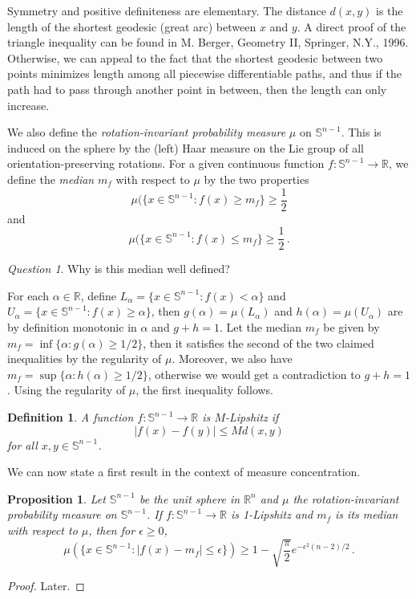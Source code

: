 \documentclass[12pt]{article}
\newtheorem{prop}[thm]{Proposition}
\newtheorem{defn}[thm]{Definition}
\theoremstyle{remark}
\newtheorem{question}[thm]{Question}
\def\eps{\epsilon}
\def\Snm1{\mathbb S^{n-1}}
\def\R{\mathbb R}
\begin{document}
Symmetry and positive definiteness are elementary.
The distance $d(x,y)$ is the length of the shortest geodesic (great arc) between $x$ and $y$. A direct proof of
the triangle inequality can be found in M. Berger, Geometry II, Springer, N.Y., 1996. Otherwise, we can 
appeal to the fact that the shortest geodesic between two points minimizes length among all piecewise differentiable
paths, and thus if the path had to pass through another point in between, then the length can only increase.

We also define the {\em rotation-invariant probability measure} $\mu$ on $\Snm1$. This is induced on the sphere by 
the (left) Haar measure on the Lie group of all orientation-preserving rotations. For a given continuous function
$f: \Snm1 \to \R$, we define the {\em median} $m_f$ with respect to $\mu$ by the two properties
$$
   \mu(\{x \in \Snm1: f(x) \ge m_f\} \ge \frac 1 2
$$ 
and
$$
    \mu(\{x \in \Snm1: f(x) \le m_f\} \ge \frac 1 2 \, .
$$

\begin{question} Why is this median well defined?\end{question}

For each $\alpha\in \mathbb R$, define $L_\alpha = \{x \in \Snm1: f(x) < \alpha\}$ and
$U_\alpha = \{x \in \Snm1: f(x) \ge \alpha\}$,
then $g(\alpha)=\mu(L_\alpha)$ and $h(\alpha)=\mu(U_\alpha)$ are by definition monotonic in $\alpha$ and
$g+h=1$. Let the median $m_f$
be given by $m_f=\inf\{ \alpha: g(\alpha)\ge 1/2\}$, then it satisfies the second of the two claimed inequalities
by the regularity of $\mu$. Moreover, we also have $m_f = \sup\{ \alpha:  h(\alpha) \ge 1/2\}$, otherwise we would
get a contradiction to $g+h=1$. Using the regularity of $\mu$, the first inequality follows.

\begin{defn} A function $ f : \Snm1 \to \R$ is $M$-Lipshitz if
$$
    |f(x) - f(y)| \le M d(x,y)
$$
for all $x, y \in \Snm1$.
\end{defn}

We can now state a first result in the context of  measure concentration.

\begin{prop} \label{prop:consnm1}Let $\Snm1$ be the unit sphere in $\mathbb R^n$ and $\mu$ the
rotation-invariant probability measure on $\Snm1$. If $f: \Snm1 \to \R$ is 1-Lipshitz and $m_f$ is its
median with respect to $\mu$, then for $\eps\ge 0$,
$$
    \mu(\{x \in \Snm1: |f(x) - m_f| \le \eps\}) \ge 1 - \sqrt{\frac{\pi}{2}} e^{- \eps^2 (n-2)/2} \, . 
$$
\end{prop}
\begin{proof} Later. \end{proof}
\end{document}
